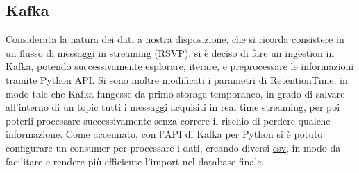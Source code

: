 \documentclass[fleqn,10pt]{SelfArx} %
\begin{document}
{\subsection{Kafka}
Considerata la natura dei dati a nostra disposizione, che si ricorda consistere in un flusso di messaggi in streaming (RSVP), si è deciso di fare un ingestion in Kafka, potendo successivamente esplorare, iterare, e preprocessare le informazioni tramite Python API.
Si sono inoltre modificati i parametri di RetentionTime, in modo tale che Kafka fungesse da primo storage temporaneo, in grado di salvare all'interno di un topic tutti i messaggi acquisiti in real time streaming, per poi poterli processare successivamente senza correre il rischio di perdere qualche informazione.
Come accennato, con l'API di Kafka per Python si è potuto configurare un consumer per processare i dati, creando diversi \href{https://github.com/DBertazioli/Armeetup/tree/master/csv/struttura}{csv}, %
 in modo da facilitare e rendere più efficiente l'import nel database finale.
}
\end{document}
